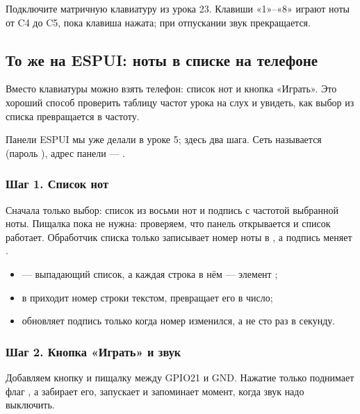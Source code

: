 Подключите матричную клавиатуру из урока 23. Клавиши «1»--«8» играют ноты от C4 до C5, пока клавиша
нажата; при отпускании звук прекращается.

\subsection{То же на ESPUI: ноты в списке на телефоне}

Вместо клавиатуры можно взять телефон: список нот и кнопка «Играть». Это хороший способ
проверить таблицу частот урока на слух и увидеть, как выбор из списка превращается в частоту.

Панели ESPUI мы уже делали в уроке 5; здесь два шага. Сеть называется 
(пароль ), адрес панели --- .

\subsubsection{Шаг 1. Список нот}

Сначала только выбор: список из восьми нот и подпись с частотой выбранной ноты. Пищалка пока не нужна:
проверяем, что панель открывается и список работает. Обработчик списка только записывает номер ноты
в , а подпись меняет .


\begin{itemize}[leftmargin=*]
  \item {} --- выпадающий список, а каждая строка в нём --- элемент ;
  \item в  приходит номер строки текстом,  превращает его в число;
  \item {} обновляет подпись только когда номер изменился, а не сто раз в секунду.
\end{itemize}

\subsubsection{Шаг 2. Кнопка «Играть» и звук}

Добавляем кнопку и пищалку между GPIO21 и GND. Нажатие только поднимает флаг , а
 забирает его, запускает  и запоминает момент, когда звук надо выключить.

